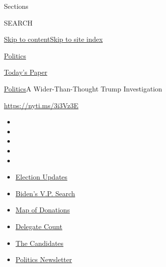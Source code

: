 Sections

SEARCH

\protect\hyperlink{site-content}{Skip to
content}\protect\hyperlink{site-index}{Skip to site index}

\href{https://www.nytimes3xbfgragh.onion/section/politics}{Politics}

\href{https://myaccount.nytimes3xbfgragh.onion/auth/login?response_type=cookie\&client_id=vi}{}

\href{https://www.nytimes3xbfgragh.onion/section/todayspaper}{Today's
Paper}

\href{/section/politics}{Politics}\textbar{}A Wider-Than-Thought Trump
Investigation

\url{https://nyti.ms/3i3Vz3E}

\begin{itemize}
\item
\item
\item
\item
\item
\end{itemize}

\begin{itemize}
\item
  \href{https://www.nytimes3xbfgragh.onion/2020/08/04/us/elections/primary-election-michigan-arizona-kansas.html?action=click\&pgtype=Article\&state=default\&region=TOP_BANNER\&context=storylines_menu}{Election
  Updates}
\item
  \href{https://www.nytimes3xbfgragh.onion/article/biden-vice-president-2020.html?action=click\&pgtype=Article\&state=default\&region=TOP_BANNER\&context=storylines_menu}{Biden's
  V.P. Search}
\item
  \href{https://www.nytimes3xbfgragh.onion/interactive/2020/07/24/us/politics/trump-biden-campaign-donors.html?action=click\&pgtype=Article\&state=default\&region=TOP_BANNER\&context=storylines_menu}{Map
  of Donations}
\item
  \href{https://www.nytimes3xbfgragh.onion/interactive/2020/us/elections/delegate-count-primary-results.html?action=click\&pgtype=Article\&state=default\&region=TOP_BANNER\&context=storylines_menu}{Delegate
  Count}
\item
  \href{https://www.nytimes3xbfgragh.onion/interactive/2019/us/politics/2020-presidential-candidates.html?action=click\&pgtype=Article\&state=default\&region=TOP_BANNER\&context=storylines_menu}{The
  Candidates}
\item
  \href{https://www.nytimes3xbfgragh.onion/newsletters/politics?action=click\&pgtype=Article\&state=default\&region=TOP_BANNER\&context=storylines_menu}{Politics
  Newsletter}
\end{itemize}

